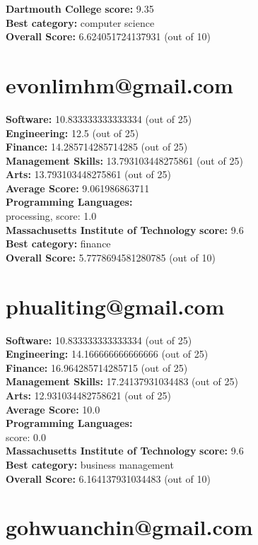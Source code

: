 \documentclass{article}
\begin{document}
\textbf{Dartmouth College} \textbf{score:} 9.35\\
\textbf{Best category: } computer science\\
\textbf{Overall Score: }6.624051724137931 (out of 10)\section{evonlimhm@gmail.com}
\textbf{Software:} 10.833333333333334 (out of 25)\\
\textbf{Engineering: } 12.5 (out of 25)\\
\textbf{Finance:} 14.285714285714285 (out of 25)\\
\textbf{Management Skills:} 13.793103448275861 (out of 25)\\
\textbf{Arts:} 13.793103448275861 (out of 25)\\
\textbf{Average Score: } 9.061986863711\\
\textbf{Programming Languages:} \\
processing, score: 1.0\\
\textbf{Massachusetts Institute of Technology} \textbf{score:} 9.6\\
\textbf{Best category: } finance\\
\textbf{Overall Score: }5.7778694581280785 (out of 10)\section{phualiting@gmail.com}
\textbf{Software:} 10.833333333333334 (out of 25)\\
\textbf{Engineering: } 14.166666666666666 (out of 25)\\
\textbf{Finance:} 16.964285714285715 (out of 25)\\
\textbf{Management Skills:} 17.24137931034483 (out of 25)\\
\textbf{Arts:} 12.931034482758621 (out of 25)\\
\textbf{Average Score: } 10.0\\
\textbf{Programming Languages:} \\
score: 0.0\\
\textbf{Massachusetts Institute of Technology} \textbf{score:} 9.6\\
\textbf{Best category: } business management\\
\textbf{Overall Score: }6.164137931034483 (out of 10)\section{gohwuanchin@gmail.com}
\end{document}

